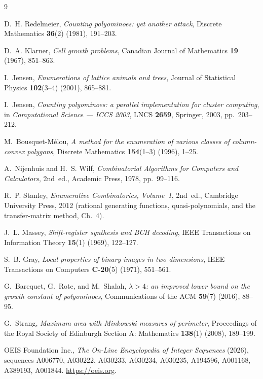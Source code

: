 \documentclass[11pt]{article}
\begin{document}
\begin{thebibliography}{9}

D.~H. Redelmeier,
\emph{Counting polyominoes: yet another attack},
Discrete Mathematics \textbf{36}(2) (1981), 191--203.

D.~A. Klarner,
\emph{Cell growth problems},
Canadian Journal of Mathematics \textbf{19} (1967), 851--863.

I.~Jensen,
\emph{Enumerations of lattice animals and trees},
Journal of Statistical Physics \textbf{102}(3--4) (2001), 865--881.

I.~Jensen,
\emph{Counting polyominoes: a parallel implementation for cluster computing},
in \emph{Computational Science --- ICCS 2003}, LNCS \textbf{2659}, Springer,
2003, pp.~203--212.

M.~Bousquet-M\'elou,
\emph{A method for the enumeration of various classes of column-convex polygons},
Discrete Mathematics \textbf{154}(1--3) (1996), 1--25.

A.~Nijenhuis and H.~S. Wilf,
\emph{Combinatorial Algorithms for Computers and Calculators}, 2nd~ed.,
Academic Press, 1978, pp.~99--116.

R.~P. Stanley,
\emph{Enumerative Combinatorics, Volume~1}, 2nd~ed.,
Cambridge University Press, 2012 (rational generating functions,
quasi-polynomials, and the transfer-matrix method, Ch.~4).

J.~L. Massey,
\emph{Shift-register synthesis and BCH decoding},
IEEE Transactions on Information Theory \textbf{15}(1) (1969), 122--127.

S.~B. Gray,
\emph{Local properties of binary images in two dimensions},
IEEE Transactions on Computers \textbf{C-20}(5) (1971), 551--561.

G.~Barequet, G.~Rote, and M.~Shalah,
\emph{$\lambda > 4$: an improved lower bound on the growth constant of polyominoes},
Communications of the ACM \textbf{59}(7) (2016), 88--95.

G.~Strang,
\emph{Maximum area with Minkowski measures of perimeter},
Proceedings of the Royal Society of Edinburgh Section A: Mathematics
\textbf{138}(1) (2008), 189--199.

OEIS Foundation Inc.,
\emph{The On-Line Encyclopedia of Integer Sequences} (2026),
sequences A006770, A030222, A030233, A030234, A030235, A194596, A001168,
A389193, A001844.
\url{https://oeis.org}.

\end{thebibliography}
\end{document}
